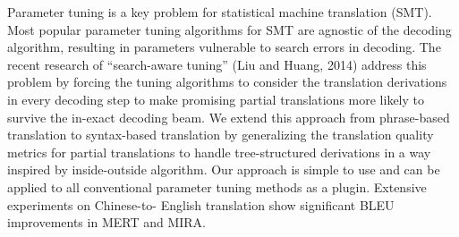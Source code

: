 Parameter tuning is a key problem for statistical machine translation (SMT). Most popular parameter tuning algorithms for SMT are agnostic of the decoding algorithm, resulting in parameters vulnerable to search errors in decoding. The recent research of ``search-aware tuning'' (Liu and Huang, 2014) address this problem by forcing the tuning algorithms to consider the translation derivations in every decoding step to make promising partial translations more likely to survive the in-exact decoding beam. We extend this approach from phrase-based translation to syntax-based translation by generalizing the translation quality metrics for partial translations to handle tree-structured derivations in a way inspired by inside-outside algorithm. Our approach is simple to use and can be applied to all conventional parameter tuning methods as a plugin. Extensive experiments on Chinese-to- English translation show significant BLEU improvements in MERT and MIRA.

